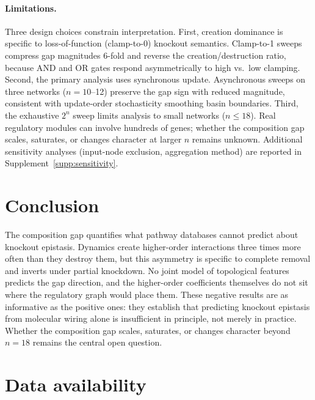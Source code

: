 \documentclass[10pt]{article}
\begin{document}
\paragraph{Limitations.}
Three design choices constrain interpretation.
First, creation dominance is specific to loss-of-function (clamp-to-0)
knockout semantics. Clamp-to-1 sweeps compress gap magnitudes 6-fold
and reverse the creation/destruction ratio, because AND and OR gates
respond asymmetrically to high vs.\ low clamping.
Second, the primary analysis uses synchronous update.
Asynchronous sweeps on three networks ($n = 10$--12)
preserve the gap sign with reduced magnitude, consistent with
update-order stochasticity smoothing basin boundaries.
Third, the exhaustive $2^n$ sweep limits analysis to small
networks ($n \leq 18$). Real regulatory modules can involve
hundreds of genes; whether the composition gap scales, saturates,
or changes character at larger $n$ remains unknown.
Additional sensitivity analyses (input-node exclusion,
aggregation method) are reported in
Supplement~\ref{supp:sensitivity}.


\section{Conclusion}
\label{sec:conclusion}

The composition gap quantifies what pathway databases cannot predict
about knockout epistasis. Dynamics create higher-order interactions
three times more often than they destroy them, but this asymmetry is
specific to complete removal and inverts under partial knockdown.
No joint model of topological features predicts the gap direction,
and the higher-order coefficients themselves do not sit where the
regulatory graph would place them. These negative results are as
informative as the positive ones: they establish that predicting
knockout epistasis from molecular wiring alone is insufficient in
principle, not merely in practice. Whether the composition gap
scales, saturates, or changes character beyond $n = 18$ remains the
central open question.


\section*{Data availability}
\end{document}
